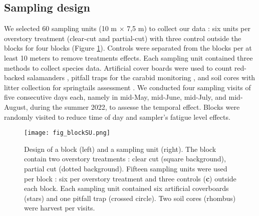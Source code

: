 \subsection*{Sampling design}
\label{subsec:sampling}


We selected 60 sampling units (10 m $\times$ 7,5 m) to collect our data : six units per overstory treatment (clear-cut and partial-cut) with three control outside the blocks for four blocks (Figure \ref*{fig:blockSU}).
Controls were separated from the blocks per at least 10 meters to remove treatments effects.
Each sampling unit contained three methods to collect species data. 
Artificial cover boards were used to count red-backed salamanders \citep{hesedUncoveringSalamanderEcology2012,mazerolleWoodlandSalamanderPopulation2021a,mooreComparisonPopulationEastern2009c}, 
pitfall traps for the carabid monitoring \citep{spenceSamplingCarabidAssemblages1994a}, and soil cores with litter collection for springtails assessment \citep{rousseauForestFloorMesofauna2018}.
We conducted four sampling visits of five consecutive days each, namely in mid-May, mid-June, mid-July, and mid-August, during the summer 2022, to assesse the temporal effect. 
Blocks were randomly visited to reduce time of day and sampler's fatigue level effects.

\pagebreak

\begin{figure}[ht]
	\centering
	\texttt{[image: fig\_blockSU.png]}
	\caption[Design of one block and one sampling unit with three sampling methods.]{
  Design of a block (left) and a sampling unit (right). 
  The block contain two overstory treatments : clear cut (square background), partial cut (dotted background). 
  Fifteen sampling units were used per block : six per overstory treatment and three controls (\textbf{c}) outside each block.
  Each sampling unit contained six artificial coverboards (stars) and one pitfall trap (crossed circle). Two soil cores (rhombus) were harvest per visits.
  }
	\label{fig:blockSU}
	\end{figure}  

  \vspace{0.5cm}

